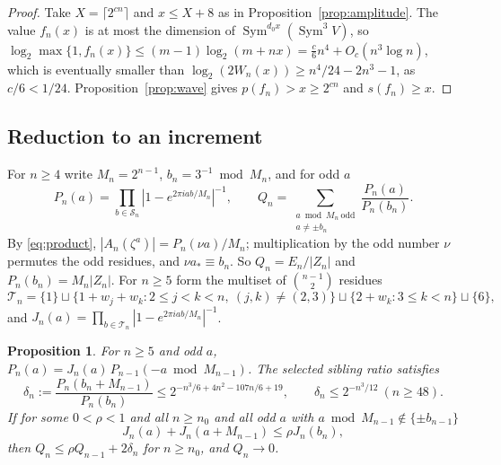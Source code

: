 \documentclass[11pt,a4paper]{article}
\newtheorem{proposition}[theorem]{Proposition}
\theoremstyle{definition}
\newcommand{\Sym}{\operatorname{Sym}}
\begin{document}
\begin{proof}
Take $X=\lceil2^{cn}\rceil$ and $x\le X+8$ as in
Proposition~\ref{prop:amplitude}. The value $f_n(x)$ is at most the dimension
of $\Sym^{d_0x}(\Sym^3V)$, so
$\log_2\max\{1,f_n(x)\}\le(m-1)\log_2(m+nx)=\frac c6n^4+O_c(n^3\log n)$, which
is eventually smaller than $\log_2(2W_n(x))\ge n^4/24-2n^3-1$, as $c/6<1/24$.
Proposition~\ref{prop:wave} gives $p(f_n)>x\ge2^{cn}$ and $s(f_n)\ge x$.
\end{proof}

\subsection{Reduction to an increment}

For $n\ge4$ write $M_n=2^{n-1}$, $b_n=3^{-1}\bmod M_n$, and for odd $a$
\begin{equation}\label{eq:Pn}
 P_n(a)=\prod_{b\in\mathcal S_n}|1-e^{2\pi iab/M_n}|^{-1},\qquad
 Q_n=\sum_{\substack{a\bmod M_n\ \mathrm{odd}\\a\ne\pm b_n}}\frac{P_n(a)}{P_n(b_n)} .
\end{equation}
By \eqref{eq:product}, $|A_n(\zeta^a)|=P_n(\nu a)/M_n$; multiplication by the
odd number $\nu$ permutes the odd residues, and $\nu a_*\equiv b_n$. So
$Q_n=E_n/|Z_n|$ and $P_n(b_n)=M_n|Z_n|$. For $n\ge5$ form the multiset of
$\binom{n-1}2$ residues
\begin{equation}\label{eq:Tn}
 \mathcal T_n=\{1\}\sqcup\{1+w_j+w_k:2\le j<k<n,\ (j,k)\ne(2,3)\}
 \sqcup\{2+w_k:3\le k<n\}\sqcup\{6\},
\end{equation}
and $J_n(a)=\prod_{b\in\mathcal T_n}|1-e^{2\pi iab/M_n}|^{-1}$.

\begin{proposition}\label{prop:recursion}
For $n\ge5$ and odd $a$, $P_n(a)=J_n(a)\,P_{n-1}(-a\bmod M_{n-1})$. The selected
sibling ratio satisfies
\begin{equation}\label{eq:sibling}
 \delta_n:=\frac{P_n(b_n+M_{n-1})}{P_n(b_n)}\le2^{-n^3/6+4n^2-107n/6+19},
 \qquad\delta_n\le2^{-n^3/12}\ (n\ge48).
\end{equation}
If for some $0<\rho<1$ and all $n\ge n_0$ and all odd $a$ with
$a\bmod M_{n-1}\notin\{\pm b_{n-1}\}$
\begin{equation}\label{eq:contraction}
 J_n(a)+J_n(a+M_{n-1})\le\rho J_n(b_n),
\end{equation}
then $Q_n\le\rho Q_{n-1}+2\delta_n$ for $n\ge n_0$, and $Q_n\to0$.
\end{proposition}
\end{document}
